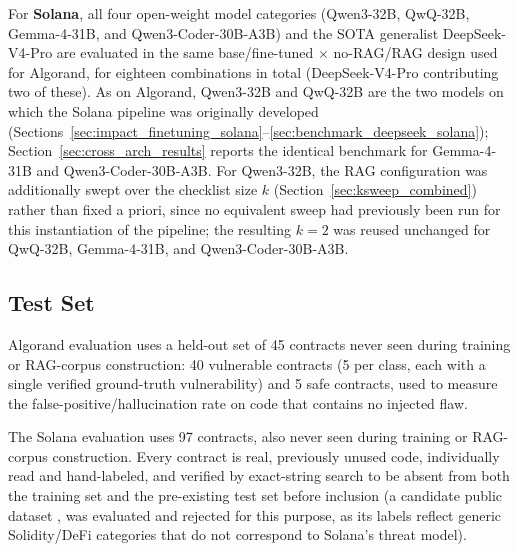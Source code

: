 \documentclass[lettersize,journal]{IEEEtran}
\begin{document}
For \textbf{Solana}, all four open-weight model categories (Qwen3-32B, QwQ-32B, Gemma-4-31B, and
Qwen3-Coder-30B-A3B) and the SOTA generalist DeepSeek-V4-Pro are evaluated in the same
base/fine-tuned $\times$ no-RAG/RAG design used for Algorand, for eighteen combinations in total
(DeepSeek-V4-Pro contributing two of these). As on Algorand, Qwen3-32B and QwQ-32B are the two
models on which the Solana pipeline was originally developed
(Sections~\ref{sec:impact_finetuning_solana}--\ref{sec:benchmark_deepseek_solana});
Section~\ref{sec:cross_arch_results} reports the identical benchmark for Gemma-4-31B and
Qwen3-Coder-30B-A3B. For Qwen3-32B, the RAG configuration was additionally swept over the checklist
size $k$ (Section~\ref{sec:ksweep_combined}) rather than fixed a priori, since no equivalent sweep
had previously been run for this instantiation of the pipeline; the resulting $k=2$ was reused
unchanged for QwQ-32B, Gemma-4-31B, and Qwen3-Coder-30B-A3B.

\subsection{Test Set}
\label{sec:test_set}
Algorand evaluation uses a held-out set of 45 contracts never seen during training or RAG-corpus
construction: 40 vulnerable contracts (5 per class, each with a single verified ground-truth
vulnerability) and 5 safe contracts, used to measure the false-positive/hallucination rate on code
that contains no injected flaw.

The Solana evaluation uses 97 contracts, also never seen during training or RAG-corpus construction.
Every contract is real, previously unused code, individually read and hand-labeled, and verified by
exact-string search to be absent from both the training set and the pre-existing test set before
inclusion (a candidate public dataset %
\cite{armurai_solana_dataset}, was evaluated and rejected for this purpose, as its labels reflect
generic Solidity/DeFi categories that do not correspond to Solana's threat model). 
\end{document}
